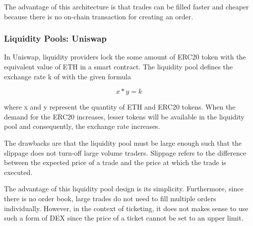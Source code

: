 The advantage of this architecture is that trades can be filled faster and cheaper because there is no on-chain transaction for creating an order.


\subsubsection{Liquidity Pools: Uniswap}

In Uniswap, liquidity providers lock the some amount of ERC20 token with the equivalent value of ETH in a smart contract. The liquidity pool defines the exchange rate k of with the given formula 

\[ x * y = k \]

where x and y represent the quantity of ETH and ERC20 tokens. When the demand for the ERC20 increases, lesser tokens will be available in the liquidity pool and consequently, the exchange rate increases. 

The drawbacks are that the liquidity pool must be large enough such that the slippage does not turn-off large volume traders. Slippage refers to the difference between the expected price of a trade and the price at which the trade is executed. 

The advantage of this liquidity pool design is its simplicity. Furthermore, since there is no order book, large trades do not need to fill multiple orders individually. However, in the context of ticketing, it does not makes sense to use such a form of DEX since the price of a ticket cannot be set to an upper limit. 